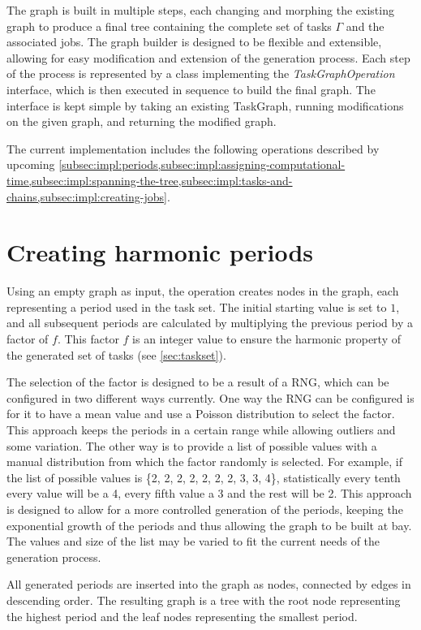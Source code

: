 The graph is built in multiple steps, each changing and morphing the existing graph to produce a final tree containing the complete set of tasks $\Gamma$ and the associated jobs.
The graph builder is designed to be flexible and extensible, allowing for easy modification and extension of the generation process.
Each step of the process is represented by a class implementing the \textit{TaskGraphOperation} interface, which is then executed in sequence to build the final graph.
The interface is kept simple by taking an existing TaskGraph, running modifications on the given graph, and returning the modified graph.

The current implementation includes the following operations described by upcoming \cref{subsec:impl:periods,subsec:impl:assigning-computational-time,subsec:impl:spanning-the-tree,subsec:impl:tasks-and-chains,subsec:impl:creating-jobs}.

\section{Creating harmonic periods}\label{subsec:impl:periods}
Using an empty graph as input, the operation creates nodes in the graph, each representing a period used in the task set.
The initial starting value is set to $1$, and all subsequent periods are calculated by multiplying the previous period by a factor of $f$.
This factor $f$ is an integer value to ensure the harmonic property of the generated set of tasks (see \cref{sec:taskset}).

The selection of the factor is designed to be a result of a \ac{RNG}, which can be configured in two different ways currently.
One way the \ac{RNG} can be configured is for it to have a mean value and use a Poisson distribution to select the factor.
This approach keeps the periods in a certain range while allowing outliers and some variation.
The other way is to provide a list of possible values with a manual distribution from which the factor randomly is selected.
For example, if the list of possible values is \{2, 2, 2, 2, 2, 2, 2, 3, 3, 4\}, statistically every tenth every value will be a 4, every fifth value a 3 and the rest will be 2.
This approach is designed to allow for a more controlled generation of the periods, keeping the exponential growth of the periods and thus allowing the graph to be built at bay.
The values and size of the list may be varied to fit the current needs of the generation process.

All generated periods are inserted into the graph as nodes, connected by edges in descending order.
The resulting graph is a tree with the root node representing the highest period and the leaf nodes representing the smallest period.


